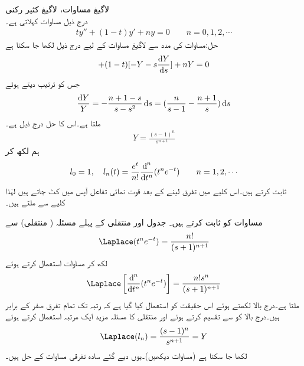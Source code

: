 \quad لاگیغ مساوات، لاگیغ کثیر رکنی\\
درج ذیل  مساوات کہلاتی ہے۔ 
\begin{align}\label{مساوات_لاپلاس_لاگیغ_کی_مساوات}
ty''+(1-t)y'+ny=0\quad \quad n=0,1,2,\cdots
\end{align}
حل:مساوات  کی مدد سے لاگیغ مساوات کے لیے درج ذیل لکھا جا سکتا ہے
\begin{align*}
[-2sY-s^2\frac{\dif Y}{\dif s}+y(0)]+(1-t)[-Y-s\frac{\dif Y}{\dif s}]+nY=0
\end{align*}
جس کو ترتیب دیتے ہوئے
\begin{align*}
\frac{\dif Y}{Y}=-\frac{n+1-s}{s-s^2}\dif s=(\frac{n}{s-1}-\frac{n+1}{s})\dif s
\end{align*}
ملتا ہے۔اس کا حل درج ذیل ہے۔
\begin{align}
Y=\frac{(s-1)^n}{s^{n+1}}
\end{align}
ہم  لکھ کر 
\begin{align}\label{مساوات_لاپلاس_روڈریکیس_کثیر_رکنی}
l_0=1,\quad l_n(t)=\frac{e^t}{n!}\frac{\dif^{\,n}}{\dif t^n}(t^ne^{-t})\quad \quad n=1,2,\cdots
\end{align}
ثابت کرتے ہیں۔اس کلیے میں تفرق لینے کے بعد قوت نمائی تفاعل آپس میں کٹ جاتے ہیں لہٰذا کلیے سے  ملتے ہیں۔ 

مساوات  کو ثابت کرتے ہیں۔ جدول  اور منتقلی کے پہلے مسئلہ ( منتقلی) سے
\begin{align}
\Laplace(t^ne^{-t})=\frac{n!}{(s+1)^{n+1}}
\end{align}
لکھ کر مساوات  استعمال کرتے ہوئے
\begin{align*}
\Laplace\left[\frac{\dif^{\,n}}{\dif t^n} (t^ne^{-t})\right]=\frac{n!s^n}{(s+1)^{n+1}}
\end{align*}
ملتا ہے۔درج بالا لکھتے ہوئے اس حقیقت کو استعمال کیا گیا ہے کہ رتبہ  تک تمام تفرق صفر کے برابر ہیں۔درج بالا کو  سے تقسیم کرتے ہوئے اور منتقلی کا مسئلہ مزید ایک مرتبہ استعمال کرتے ہوئے
\begin{align*}
\Laplace(l_n)=\frac{(s-1)^n}{s^{n+1}}=Y
\end{align*}
لکھا جا سکتا ہے (مساوات  دیکھیں)۔یوں  دیے گئے سادہ تفرقی مساوات کے حل ہیں۔

